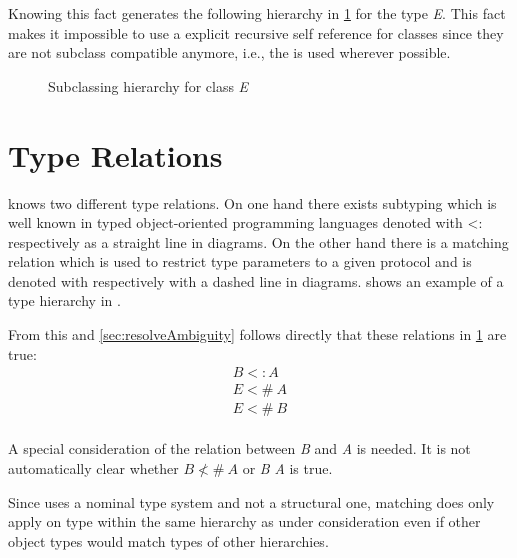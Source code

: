 Knowing this fact generates the following hierarchy in \cref{fig:fixedHierarchy}
for the type \emph{E}. This fact makes it impossible to use a explicit recursive
self reference for classes since they are not subclass compatible anymore, i.e.,
the \mytype is used wherever possible. 

\begin{figure}[h]
	\centering
	\caption{Subclassing hierarchy for class \emph{E}}
	\label{fig:fixedHierarchy}
\end{figure}

\section{Type Relations}
\ooplss knows two different type relations. On one hand there exists
subtyping which is well known in typed object-oriented programming
languages denoted with <: respectively as a straight line in diagrams. On
the other hand there is a matching relation which is used to restrict type
parameters to a given protocol and is denoted with \match respectively
with a dashed line in diagrams.  shows an example
of a type hierarchy in \ooplss.

From this and \cref{sec:resolveAmbiguity} follows directly that these
relations in \cref{fig:fixedHierarchy} are true:
\begin{align*}
B <: A \\
E <\!\!\#~A \\
E <\!\!\#~B \\
\end{align*}

A special consideration of the relation between \emph{B} and \emph{A}
is needed. It is not automatically clear whether $B \nless\!\!\#~A$
or \emph{B} \match \emph{A} is true.

Since \ooplss uses a nominal type system and not a structural one,
matching does only apply on type within the same hierarchy as under
consideration even if other object types would match types of other
hierarchies.

